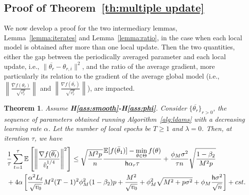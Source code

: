 \documentclass[11pt]{article}
\newtheorem*{Theorem*}{Theorem}
\newcommand{\beq}{\begin{equation}}
\newcommand{\eeq}{\end{equation}}
\def\EE{\mathbb{E}}
\def\tot{\mathsf{h}}
\begin{document}
\subsection{Proof of Theorem~\ref{th:multiple update}} \label{app:proofmain}



We now develop a proof for the two intermediary lemmas, Lemma~\ref{lemma:iterates} and Lemma~\ref{lemma:ratio}, in the case when each local model is obtained after more than one local update.
Then the two quantities, either the gap between the periodically averaged parameter and each local update, i.e., $\| \overline{\theta_r} - \theta_{r,i} \|^2$, and the ratio of the average gradient, more particularly its relation to the gradient of the average global model (i.e., $\left\| \frac{\overline{\nabla}f(\theta_r)}{\sqrt{ v_r^t}} \right\|$ and $ \left\| \frac{\nabla f(\overline{\theta_r})}{\sqrt{ v_r^t}} \right\| $), are impacted.

\begin{Theorem*}
Assume \textbf{H\ref{ass:smooth}-H\ref{ass:phi}}. Consider $\{\overline{\theta_r}\}_{r>0}$, the sequence of parameters obtained running Algorithm~\ref{alg:ldams} with a decreasing learning rate $\alpha$. Let the number of local epochs be $T \geq 1$ and $\lambda = 0$. Then, at iteration $\tau$, we have
\beq \notag
\begin{split}
&  \frac{1}{\tau}\sum_{t=1}^\tau  \EE\left[ \left\| \frac{\nabla f(\overline{\theta_t})}{\hat v_t^{1/4}}   \right \|^2 \right] \leq    \sqrt{\frac{M^2 p}{n}}  \frac{ \EE[f(\bar{\theta}_1)]  - \min \limits_{\theta \in \Theta} f(\theta)}{\tot \alpha_r \tau} +      \frac{\phi_M   \sigma^2}{\tau n} \sqrt{\frac{1 - \beta_2}{M^2 p}  } \\
    &   +4\alpha \left[ \frac{\alpha^2 L_\ell}{\sqrt{v_0}} M^2 (T-1)^2 \phi_M^2 (1-\beta_2)p + \frac{M^2}{\sqrt{v_0}}+\phi_M^2\sqrt{M^2+p\sigma^2} + \phi_M \frac{\tot \sigma^2}{\sqrt{n}}\right]   + cst. \\
   \end{split}
\eeq
\end{Theorem*}
\end{document}
